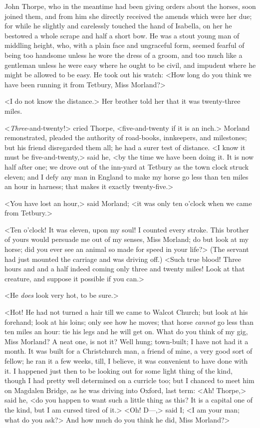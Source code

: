  John Thorpe, who in the meantime had been giving orders about the horses, soon joined them, and from him she directly received the amends which were her due; for while he slightly and carelessly touched the hand of Isabella, on her he bestowed a whole scrape and half a short bow. He was a stout young man of middling height, who, with a plain face and ungraceful form, seemed fearful of being too handsome unless he wore the dress of a groom, and too much like a gentleman unless he were easy where he ought to be civil, and impudent where he might be allowed to be easy. He took out his watch: <How long do you think we have been running it from Tetbury, Miss Morland?> 

 <I do not know the distance.> Her brother told her that it was twenty-three miles. 

 <\textit{Three}-and-twenty!> cried Thorpe, <five-and-twenty if it is an inch.> Morland remonstrated, pleaded the authority of road-books, innkeepers, and milestones; but his friend disregarded them all; he had a surer test of distance. <I know it must be five-and-twenty,> said he, <by the time we have been doing it. It is now half after one; we drove out of the inn-yard at Tetbury as the town clock struck eleven; and I defy any man in England to make my horse go less than ten miles an hour in harness; that makes it exactly twenty-five.> 

 <You have lost an hour,> said Morland; <it was only ten o'clock when we came from Tetbury.> 

 <Ten o'clock! It was eleven, upon my soul! I counted every stroke. This brother of yours would persuade me out of my senses, Miss Morland; do but look at my horse; did you ever see an animal so made for speed in your life?> (The servant had just mounted the carriage and was driving off.) <Such true blood! Three hours and and a half indeed coming only three and twenty miles! Look at that creature, and suppose it possible if you can.> 

 <He \textit{does} look very hot, to be sure.> 

 <Hot! He had not turned a hair till we came to Walcot Church; but look at his forehand; look at his loins; only see how he moves; that horse \textit{cannot} go less than ten miles an hour: tie his legs and he will get on. What do you think of my gig, Miss Morland? A neat one, is not it? Well hung; town-built; I have not had it a month. It was built for a Christchurch man, a friend of mine, a very good sort of fellow; he ran it a few weeks, till, I believe, it was convenient to have done with it. I happened just then to be looking out for some light thing of the kind, though I had pretty well determined on a curricle too; but I chanced to meet him on Magdalen Bridge, as he was driving into Oxford, last term: <Ah! Thorpe,> said he, <do you happen to want such a little thing as this? It is a capital one of the kind, but I am cursed tired of it.> <Oh! D—,> said I; <I am your man; what do you ask?> And how much do you think he did, Miss Morland?> 

